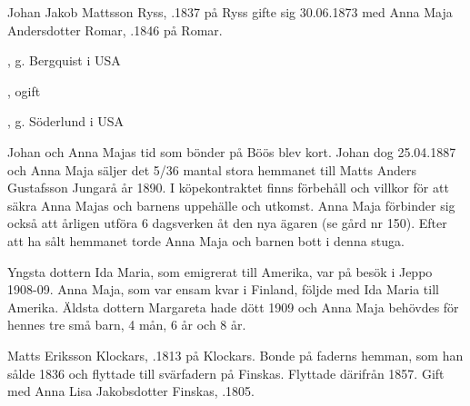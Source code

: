 Johan Jakob Mattsson Ryss, .1837 på Ryss gifte sig 30.06.1873 med Anna Maja Andersdotter Romar, .1846 på Romar.
\begin{jhchildren}
  \item {}
  \item {}, g. Bergquist i USA
  \item {}, ogift
  \item {}
  \item {}
  \item {}, g. Söderlund i USA
\end{jhchildren}
Johan och Anna Majas tid som bönder på Böös blev kort. Johan dog 25.04.1887 och Anna Maja säljer det 5/36 mantal stora hemmanet till Matts Anders Gustafsson Jungarå år 1890. I köpekontraktet finns förbehåll och villkor för att säkra Anna Majas och barnens uppehälle och utkomst. Anna Maja förbinder sig också att årligen utföra 6 dagsverken åt den nya ägaren (se gård nr 150). Efter att ha sålt hemmanet torde Anna Maja och barnen bott i denna stuga.

Yngsta dottern Ida Maria, som emigrerat till Amerika, var på besök i Jeppo 1908-09. Anna Maja, som var ensam kvar i Finland, följde med 	Ida Maria till Amerika. Äldsta dottern Margareta hade dött 1909 och Anna Maja behövdes för hennes tre små barn, 4 mån, 6 år och 8 år.


Matts Eriksson Klockars, .1813 på Klockars. Bonde på faderns hemman, som han sålde 1836 och flyttade till svärfadern på Finskas. Flyttade därifrån 1857. Gift med Anna Lisa Jakobsdotter Finskas, .1805.
\begin{jhchildren}
  \item {}
  \item {}
  \item {}
\end{jhchildren}


